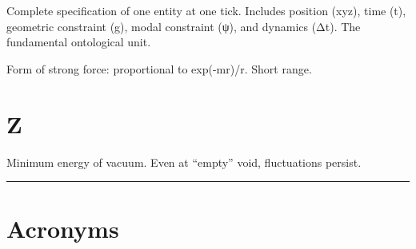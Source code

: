 \documentclass[
  11pt,
  letterpaper,
  twoside,
  openright]{book}
\providecommand{\tightlist}{%
  \setlength{\itemsep}{0pt}\setlength{\parskip}{0pt}}
\begin{document}
\begin{description}
\tightlist
\item[\textbf{xyztgψ(Δt)}]
Complete specification of one entity at one tick. Includes position
(xyz), time (t), geometric constraint (g), modal constraint (ψ), and
dynamics (Δt). The fundamental ontological unit.
\item[\textbf{Yukawa Potential}]
Form of strong force: proportional to exp(-mr)/r. Short range.
\end{description}

\section{Z}\label{z}

\begin{description}
\tightlist
\item[\textbf{Zero-Point Energy}]
Minimum energy of vacuum. Even at ``empty'' void, fluctuations persist.
\end{description}

\begin{center}\rule{0.5\linewidth}{0.5pt}\end{center}

\section{Acronyms}\label{acronyms}
\end{document}
